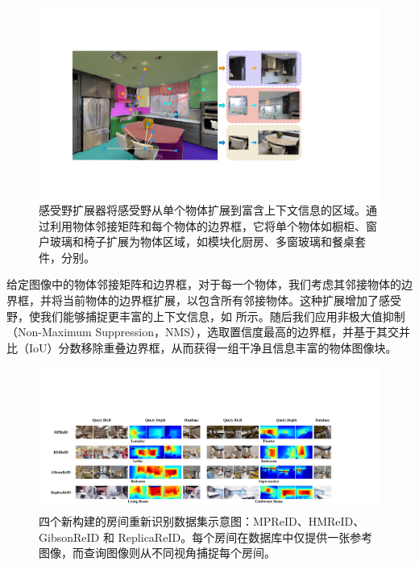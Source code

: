 \vspace{-10pt}
\begin{figure}[ht]
    \centering
    \includegraphics[width=\columnwidth]{expander.pdf}
    \vspace{-20pt}
    \caption{感受野扩展器将感受野从单个物体扩展到富含上下文信息的区域。通过利用物体邻接矩阵和每个物体的边界框，它将单个物体如橱柜、窗户玻璃和椅子扩展为物体区域，如模块化厨房、多窗玻璃和餐桌套件，分别。}
    \vspace{-5pt}
    \label{fig:expander_image}
\end{figure}

给定图像中的物体邻接矩阵和边界框，对于每一个物体，我们考虑其邻接物体的边界框，并将当前物体的边界框扩展，以包含所有邻接物体。这种扩展增加了感受野，使我们能够捕捉更丰富的上下文信息，如  所示。随后我们应用非极大值抑制（Non-Maximum Suppression，NMS），选取置信度最高的边界框，并基于其交并比（IoU）分数移除重叠边界框，从而获得一组干净且信息丰富的物体图像块。

\begin{figure}[t]
    \centering
    \includegraphics[width=\textwidth]{dataset_font.pdf}
    \vspace{-20pt}
    \caption{四个新构建的房间重新识别数据集示意图：MPReID、HMReID、GibsonReID 和 ReplicaReID。每个房间在数据库中仅提供一张参考图像，而查询图像则从不同视角捕捉每个房间。}
    \vspace{-10pt}
    \label{fig:dataset_image}
\end{figure}
